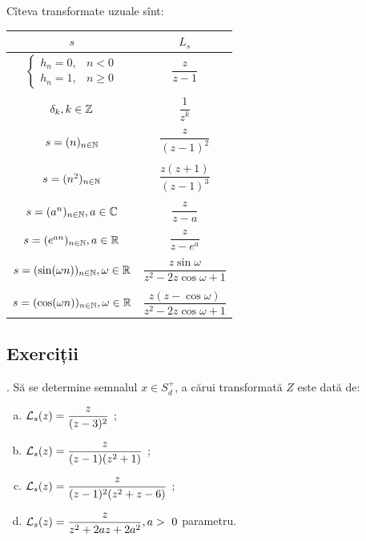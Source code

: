 Cîteva transformate uzuale sînt:
\begin{tabular}{c | c}
  $ s $ & $ L_s $ \\
  \hline\hline
  $ \begin{cases}
    h_n = 0, & n < 0 \\
    h_n = 1, & n \geq 0
  \end{cases} $ & $ \dfrac{z}{z - 1} $ \\
        & \\
  $ \delta_k, k \in \mathbb{Z} $ & $ \dfrac{1}{z^k} $ \\
        &\\
  $ s = (n)_{n \in \mathbb{N}} $ & $ \dfrac{z}{(z - 1)^2} $ \\
        &\\
  $ s = (n^2)_{n \in \mathbb{N}} $ & $ \dfrac{z(z+1)}{(z - 1)^3} $ \\
        &\\
  $ s = (a^n)_{n \in \mathbb{N}}, a \in \mathbb{C} $ & $ \dfrac{z}{z - a} $ \\
        &\\
  $ s = (e^{an})_{n \in \mathbb{N}}, a \in \mathbb{R} $ & $ \dfrac{z}{z - e^a} $ \\
        &\\
  $ s = (\sin(\omega n))_{n \in \mathbb{N}}, \omega \in \mathbb{R} $ & $ \dfrac{z \sin \omega}{z^2 - 2z \cos \omega + 1} $ \\
        &\\
  $ s = (\cos(\omega n))_{n \in \mathbb{N}}, \omega \in \mathbb{R} $ & $ \dfrac{z(z - \cos \omega)}{z^2 - 2z \cos \omega + 1} $
\end{tabular}


\subsection{Exerciții}

\indent{}. Să se determine semnalul $x \in S_d^+$, a cărui transformată $Z$ este 
dată de:
\begin{enumerate}[(a)]
\item $\mathcal{L}_s (z) = \dfrac{z}{(z-3)^2}$ ;
\item $\mathcal{L}_s (z) = \dfrac{z}{(z-1)(z^2 + 1)}$ ;
\item $\mathcal{L}_s (z) = \dfrac{z}{(z-1)^2(z^2 + z - 6)}$ ;
\item $\Lap_s (z) = \dfrac{z}{z^2 + 2az + 2a^2}, a > 0$ parametru.
\end{enumerate}

